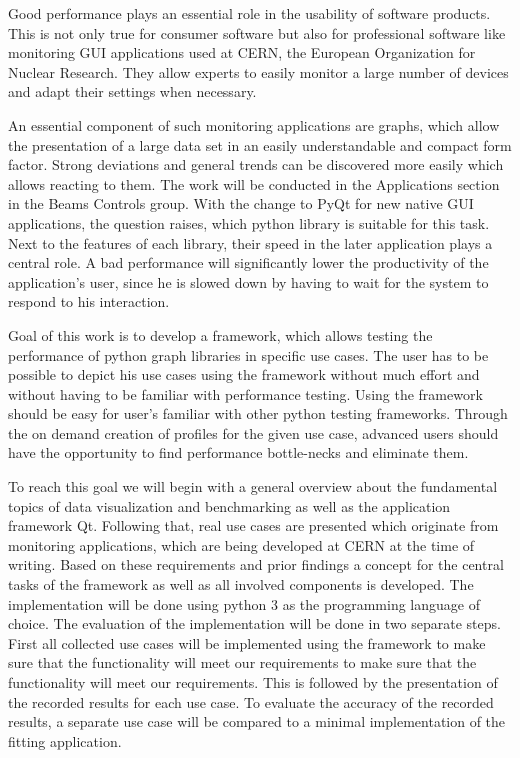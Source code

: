 

\Abstract
Good performance plays an essential role in the usability of software products.
This is not only true for consumer software but also for professional software
like monitoring GUI applications used at CERN, the European Organization for
Nuclear Research. They allow experts to easily monitor a large number of devices
and adapt their settings when necessary.

An essential component of such monitoring applications are graphs, which allow
the presentation of a large data set in an easily understandable and compact
form factor. Strong deviations and general trends can be discovered more easily
which allows reacting to them. The work will be conducted in the Applications
section in the Beams Controls group. With the change to PyQt for new native GUI
applications, the question raises, which python library is suitable for this
task. Next to the features of each library, their speed in the later application
plays a central role. A bad performance will significantly lower the
productivity of the application's user, since he is slowed down by having to wait
for the system to respond to his interaction.

Goal of this work is to develop a framework, which allows testing the
performance of python graph libraries in specific use cases. The user has to be
possible to depict his use cases using the framework without much effort and
without having to be familiar with performance testing. Using the framework
should be easy for user's familiar with other python testing frameworks. Through
the on demand creation of profiles for the given use case, advanced users should
have the opportunity to find performance bottle-necks and eliminate them.

To reach this goal we will begin with a general overview about the fundamental
topics of data visualization and benchmarking as well as the application
framework Qt. Following that, real use cases are presented which originate from
monitoring applications, which are being developed at CERN at the time of
writing. Based on these requirements and prior findings a concept for the
central tasks of the framework as well as all involved components is developed.
The implementation will be done using python 3 as the programming language of
choice. The evaluation of the implementation will be done in two separate steps.
First all collected use cases will be implemented using the framework to make
sure that the functionality will meet our requirements to make sure that the
functionality will meet our requirements. This is followed by the presentation
of the recorded results for each use case. To evaluate the accuracy of the
recorded results, a separate use case will be compared to a minimal
implementation of the fitting application.
